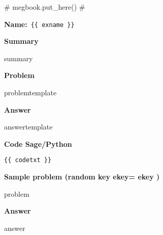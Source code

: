 {# megbook.put_here() #}

\textbf{Name:}~\verb+{{ exname }}+

\noindent\textbf{Summary} 

{{ summary }}

\noindent\textbf{Problem} 

{{ problemtemplate }}

\noindent\textbf{Answer}

{{ answertemplate }}

\noindent\textbf{Code Sage/Python}

\begin{verbatim}
{{ codetxt }}
\end{verbatim}

\noindent\textbf{Sample problem (random key ekey= {{ ekey }}) }

{{ problem }}

\noindent\textbf{Answer}

{{ answer }}




